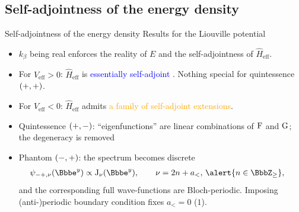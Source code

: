 \documentclass[8pt]{beamer}
\begin{document}
\subsection{Self-adjointness of the energy density}

\begin{frame}%
{Self-adjointness of the energy density}%
{Results for the Liouville potential}
\begin{itemize}
\item $k_\beta$ being real enforces the reality of $E$ and the
self-adjointness of $\widehat{H}_{\text{eff}}$.

\item For $V_{\text{eff}} > 0$: $\widehat{H}_\text{eff}$ is
\textcolor{blue}{essentially self-adjoint}%
. 
Nothing special for quintessence ${\left(+, +\right)}$.

\item For $V_{\text{eff}} < 0$: $\widehat{H}_\text{eff}$ admits
\textcolor{orange}{a family of self-adjoint extensions}.
\item Quintessence ${\left(+,-\right)}$: ``eigenfunctions'' are
linear combinations of $\operatorname{F}$ and $\operatorname{G}$;
\alert{the degeneracy is removed}
\item Phantom ${\left(-, +\right)}$: the spectrum becomes \alert{discrete}
\begin{align}
\rfun{\psi_{-+,\nu}}{\ee^y} &\propto
\rfun{\BesselJ_{\nu}}{\ee^y},\qquad \nu = 2n+a_<,\, \alert{n \in
\BbbZ_\ge},
\label{eq:Phi_nu}
\end{align}
and the corresponding full wave-functions are Bloch-periodic.
Imposing (anti-)periodic boundary condition fixes $a_< = 0$ ($1$).





\end{itemize}
\end{frame}
\end{document}
